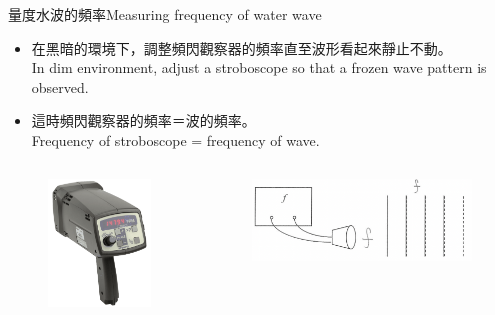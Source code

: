 \documentclass[beamer=true]{standalone}
\begin{document}
\begin{frame}{量度水波的頻率Measuring frequency of water wave}
    \begin{itemize}
        \item 在黑暗的環境下，調整頻閃觀察器的頻率直至波形看起來靜止不動。\\In dim environment, adjust a stroboscope so that a frozen wave pattern is observed.
        \item 這時頻閃觀察器的頻率＝波的頻率。\\Frequency of stroboscope = frequency of wave.

    \end{itemize}\bigskip
    \begin{columns}
        \begin{figure}
            \centering
            \includegraphics[width=0.6\linewidth]{images/Screenshot 2023-09-26 at 10.05.09 PM.png}


        \end{figure}
        \begin{figure}
            \centering
            \includegraphics[width=1\linewidth]{images/Screenshot 2023-09-26 at 10.08.47 PM.png}


        \end{figure}
    \end{columns}
\end{frame}
\end{document}
